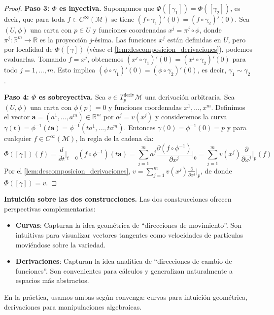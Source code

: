 \begin{proof}
\textbf{Paso 3: $\Phi$ es inyectiva.} Supongamos que $\Phi([\gamma_1]) = \Phi([\gamma_2])$, es decir, que para toda $f \in C^\infty(\mathcal{M})$ se tiene $(f \circ \gamma_1)'(0) = (f \circ \gamma_2)'(0)$. Sea $(U, \phi)$ una carta con $p \in U$ y funciones coordenadas $x^j = \pi^j \circ \phi$, donde $\pi^j: \mathbb{R}^m \to \mathbb{R}$ es la proyección $j$-ésima. Las funciones $x^j$ están definidas en $U$, pero por localidad de $\Phi([\gamma])$ (véase el \autoref{lem:descomposicion_derivaciones}), podemos evaluarlas. Tomando $f = x^j$, obtenemos $(x^j \circ \gamma_1)'(0) = (x^j \circ \gamma_2)'(0)$ para todo $j = 1, \ldots, m$. Esto implica $(\phi \circ \gamma_1)'(0) = (\phi \circ \gamma_2)'(0)$, es decir, $\gamma_1 \sim \gamma_2$.

\textbf{Paso 4: $\Phi$ es sobreyectiva.} Sea $v \in T_p^{\text{deriv}}\mathcal{M}$ una derivación arbitraria. Sea $(U, \phi)$ una carta con $\phi(p) = 0$ y funciones coordenadas $x^1, \ldots, x^m$. Definimos el vector $\mathbf{a} = (a^1, \ldots, a^m) \in \mathbb{R}^m$ por $a^j = v(x^j)$ y consideremos la curva $\gamma(t) = \phi^{-1}(t\mathbf{a}) = \phi^{-1}(ta^1, \ldots, ta^m)$. Entonces $\gamma(0) = \phi^{-1}(0) = p$ y para cualquier $f \in C^\infty(\mathcal{M})$, la regla de la cadena da:
\[
\Phi([\gamma])(f) = \frac{d}{dt}\bigg|_{t=0} (f \circ \phi^{-1})(t\mathbf{a}) = \sum_{j=1}^{m} a^j \frac{\partial (f \circ \phi^{-1})}{\partial x^j}\bigg|_{0} = \sum_{j=1}^{m} v(x^j) \frac{\partial}{\partial x^j}\bigg|_p (f)
\]
Por el \autoref{lem:descomposicion_derivaciones}, $v = \sum_{j=1}^{m} v(x^j) \frac{\partial}{\partial x^j}\big|_p$, de donde $\Phi([\gamma]) = v$.
\end{proof}

\textbf{Intuición sobre las dos construcciones.} Las dos construcciones ofrecen perspectivas complementarias:
\begin{itemize}
	\item \textbf{Curvas}: Capturan la idea geométrica de ``direcciones de movimiento''. Son intuitivas para visualizar vectores tangentes como velocidades de partículas moviéndose sobre la variedad.
	\item \textbf{Derivaciones}: Capturan la idea analítica de ``direcciones de cambio de funciones''. Son convenientes para cálculos y generalizan naturalmente a espacios más abstractos.
\end{itemize}
En la práctica, usamos ambas según convenga: curvas para intuición geométrica, derivaciones para manipulaciones algebraicas.

